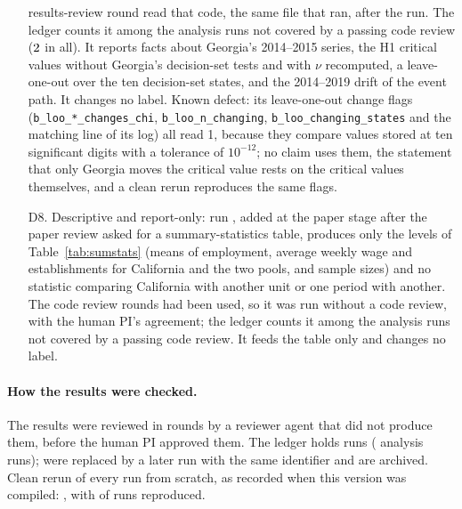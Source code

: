 \begin{enumerate}
        results-review round read that code, the same file that ran, after the run. The ledger counts it among
        the analysis runs not covered by a passing code review ($\CrewRunsUnreviewed$ in all). It reports facts
        about Georgia's 2014--2015 series, the H1 critical values without Georgia's decision-set tests
        and with $\nu$ recomputed, a leave-one-out over the ten decision-set states, and the
        2014--2019 drift of the event path. It changes no label. Known defect: its leave-one-out
        change flags (\texttt{b\_loo\_*\_changes\_chi}, \texttt{b\_loo\_n\_changing},
        \texttt{b\_loo\_changing\_states} and the matching line of its log) all read 1, because they
        compare values stored at ten significant digits with a tolerance of $10^{-12}$; no claim uses
        them, the statement that only Georgia moves the critical value rests on the critical values
        themselves, and a clean rerun reproduces the same flags.
  \item[D8.] Descriptive and report-only: run , added at the paper stage after the
        paper review asked for a summary-statistics table, produces only the levels of
        Table~\ref{tab:sumstats} (means of employment, average weekly wage and establishments for
        California and the two pools, and sample sizes) and no statistic comparing California with
        another unit or one period with another. The code review rounds had been used, so it was
        run without a code review, with the human PI's agreement; the ledger counts it among the
        analysis runs not covered by a passing code review. It feeds the table only and changes no
        label.
\end{enumerate}

\paragraph{How the results were checked.} The results were reviewed in \CrewRoundsResults{} rounds
by a reviewer agent that did not produce them, before the human PI approved them. The ledger holds
\CrewRuns{} runs (\CrewRunsAnalysis{} analysis runs); \CrewRunsSuperseded{} were replaced by a later
run with the same identifier and are archived. Clean rerun of every run from scratch, as recorded
when this version was compiled: \CrewRerunStatus{}, with \CrewRerunReproduced{} of
\CrewRerunTotal{} runs reproduced.
